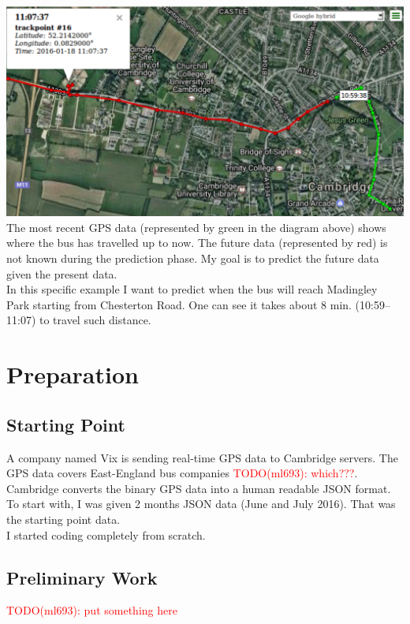 \documentclass[12pt,a4paper,oneside,openright]{report}
\begin{document}
\includegraphics[width=\textwidth]{figs/problem_overview.png} \\

The most recent GPS data (represented by green in the diagram above) shows 
where the bus has travelled up to now. The future data (represented by red)
is not known during the prediction phase. My goal is to predict the future
data given the present data. \\

In this specific example I want to predict when the bus will reach Madingley Park 
starting from Chesterton Road. One can see it takes about 8 min. (10:59--11:07)
to travel such distance.





\chapter{Preparation}

\section*{Starting Point}

A company named Vix is sending real-time GPS data to Cambridge servers. The GPS
data covers East-England bus companies \textcolor{red}{TODO(ml693): which???}. Cambridge
converts the binary GPS data into a human readable JSON format. To start with,
I was given 2 months JSON data (June and July 2016). That was the starting
point data. \\

I started coding completely from scratch.

\section*{Preliminary Work}
\textcolor{red}{TODO(ml693): put something here}
\end{document}
